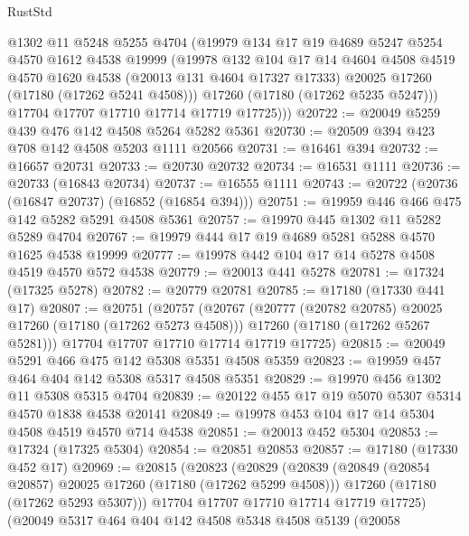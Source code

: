 \begin{lexlean}{RustStd}
\begin{coremodule}
{\begin{coremodule}
{{{{{{{{{{{{{{{{{{{{{{{{{{{{{{{{{{{{{{{{{{{{{{{{{{{{{{{          @1302
          @11
          @5248
          @5255
          @4704
          (@19979
            @134
            @17
            @19
            @4689
            @5247
            @5254
            @4570
            @1612
            @4538
            @19999
            (@19978
              @132
              @104
              @17
              @14
              @4604
              @4508
              @4519
              @4570
              @1620
              @4538
              (@20013 @131 @4604 @17327 @17333)
              @20025
              @17260
              (@17180 (@17262 @5241 @4508)))
            @17260
            (@17180 (@17262 @5235 @5247)))
          @17704
          @17707
          @17710
          @17714
          @17719
          @17725)))
@20722 := @20049 @5259 @439 @476 @142 @4508 @5264 @5282 @5361
@20730 := @20509 @394 @423 @708 @142 @4508 @5203 @1111 @20566
@20731 := @16461 @394
@20732 := @16657 @20731
@20733 := @20730 @20732
@20734 := @16531 @1111
@20736 := @20733 (@16843 @20734)
@20737 := @16555 @1111
@20743 := @20722 (@20736 (@16847 @20737) (@16852 (@16854 @394)))
@20751 := @19959 @446 @466 @475 @142 @5282 @5291 @4508 @5361
@20757 := @19970 @445 @1302 @11 @5282 @5289 @4704
@20767 := @19979 @444 @17 @19 @4689 @5281 @5288 @4570 @1625 @4538 @19999
@20777 := @19978 @442 @104 @17 @14 @5278 @4508 @4519 @4570 @572 @4538
@20779 := @20013 @441 @5278
@20781 := @17324 (@17325 @5278)
@20782 := @20779 @20781
@20785 := @17180 (@17330 @441 @17)
@20807 := @20751
    (@20757
      (@20767
        (@20777 (@20782 @20785) @20025 @17260 (@17180 (@17262 @5273 @4508)))
        @17260
        (@17180 (@17262 @5267 @5281)))
      @17704
      @17707
      @17710
      @17714
      @17719
      @17725)
@20815 := @20049 @5291 @466 @475 @142 @5308 @5351 @4508 @5359
@20823 := @19959 @457 @464 @404 @142 @5308 @5317 @4508 @5351
@20829 := @19970 @456 @1302 @11 @5308 @5315 @4704
@20839 := @20122 @455 @17 @19 @5070 @5307 @5314 @4570 @1838 @4538 @20141
@20849 := @19978 @453 @104 @17 @14 @5304 @4508 @4519 @4570 @714 @4538
@20851 := @20013 @452 @5304
@20853 := @17324 (@17325 @5304)
@20854 := @20851 @20853
@20857 := @17180 (@17330 @452 @17)
@20969 := @20815
    (@20823
      (@20829
        (@20839
          (@20849 (@20854 @20857) @20025 @17260 (@17180 (@17262 @5299 @4508)))
          @17260
          (@17180 (@17262 @5293 @5307)))
        @17704
        @17707
        @17710
        @17714
        @17719
        @17725)
      (@20049
        @5317
        @464
        @404
        @142
        @4508
        @5348
        @4508
        @5139
        (@20058
}}}}}}}}}}}}}}}}}}}}}}}}}}}}}}}}}}}}}}}}}}}}}}}}}}}}}}}
\end{coremodule}}
\end{coremodule}
\end{lexlean}
